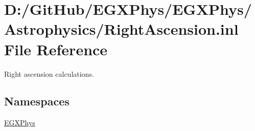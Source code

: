 \hypertarget{_right_ascension_8inl}{}\section{D\+:/\+Git\+Hub/\+E\+G\+X\+Phys/\+E\+G\+X\+Phys/\+Astrophysics/\+Right\+Ascension.inl File Reference}
\label{_right_ascension_8inl}


Right ascension calculations.  


\subsection*{Namespaces}
\begin{DoxyCompactItemize}
\item 
 \mbox{\hyperlink{namespace_e_g_x_phys}{E\+G\+X\+Phys}}
\end{DoxyCompactItemize}
